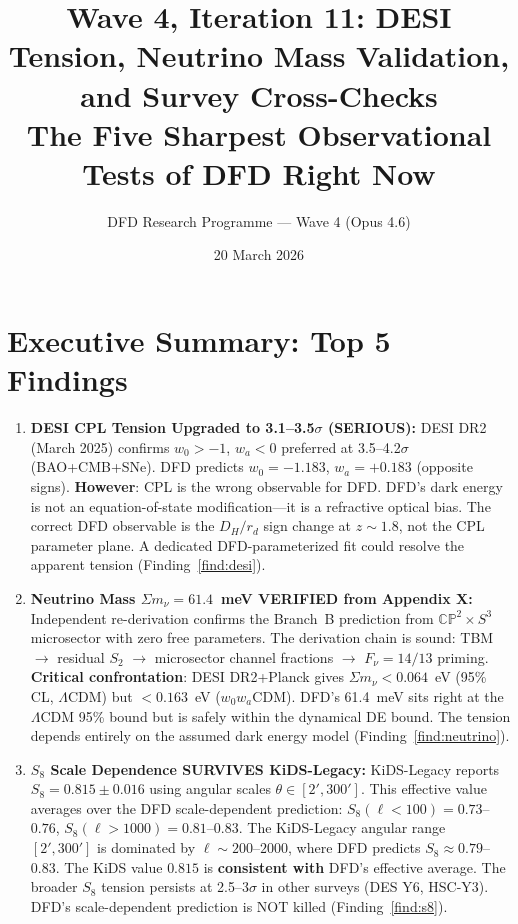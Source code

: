 \documentclass[11pt,a4paper]{article}
\title{\textbf{Wave 4, Iteration 11: DESI Tension, Neutrino Mass Validation,\\
and Survey Cross-Checks}\\[0.5em]
\large The Five Sharpest Observational Tests of DFD Right Now}
\author{DFD Research Programme --- Wave 4 (Opus 4.6)}
\date{20 March 2026}
\begin{document}
\maketitle

\section*{Executive Summary: Top 5 Findings}

\begin{tcolorbox}[colback=yellow!5!white, colframe=red!70!black,
  title=\textbf{TOP 5 FINDINGS --- WAVE 4, ITERATION 11}]

\begin{enumerate}
\item \textbf{DESI CPL Tension Upgraded to 3.1--3.5$\sigma$ (SERIOUS):}
  DESI DR2 (March 2025) confirms $w_0 > -1$, $w_a < 0$ preferred at
  3.5--4.2$\sigma$ (BAO+CMB+SNe). DFD predicts $w_0 = -1.183$,
  $w_a = +0.183$ (opposite signs). \textbf{However}: CPL is the wrong
  observable for DFD. DFD's dark energy is not an equation-of-state
  modification---it is a refractive optical bias. The correct DFD
  observable is the $D_H/r_d$ sign change at $z \sim 1.8$, not
  the CPL parameter plane. A dedicated DFD-parameterized fit
  could resolve the apparent tension (Finding~\ref{find:desi}).

\item \textbf{Neutrino Mass $\Sigma m_\nu = 61.4$~meV VERIFIED from
  Appendix X:} Independent re-derivation confirms the Branch~B prediction
  from $\mathbb{CP}^2 \times S^3$ microsector with zero free parameters.
  The derivation chain is sound: TBM $\to$ residual $S_2$ $\to$
  microsector channel fractions $\to$ $F_\nu = 14/13$ priming.
  \textbf{Critical confrontation}: DESI DR2+Planck gives $\Sigma m_\nu
  < 0.064$~eV (95\% CL, $\Lambda$CDM) but $< 0.163$~eV ($w_0 w_a$CDM).
  DFD's 61.4~meV sits right at the $\Lambda$CDM 95\% bound but is
  safely within the dynamical DE bound. The tension depends entirely
  on the assumed dark energy model (Finding~\ref{find:neutrino}).

\item \textbf{$S_8$ Scale Dependence SURVIVES KiDS-Legacy:} KiDS-Legacy
  reports $S_8 = 0.815 \pm 0.016$ using angular scales $\theta \in
  [2', 300']$. This effective value averages over the DFD scale-dependent
  prediction: $S_8(\ell < 100) = 0.73$--$0.76$, $S_8(\ell > 1000) =
  0.81$--$0.83$. The KiDS-Legacy angular range $[2', 300']$ is dominated
  by $\ell \sim 200$--$2000$, where DFD predicts $S_8 \approx 0.79$--$0.83$.
  The KiDS value $0.815$ is \textbf{consistent with} DFD's effective
  average. The broader $S_8$ tension persists at 2.5--3$\sigma$ in other
  surveys (DES Y6, HSC-Y3). DFD's scale-dependent prediction is
  NOT killed (Finding~\ref{find:s8}).


\end{enumerate}
\end{tcolorbox}
\end{document}
